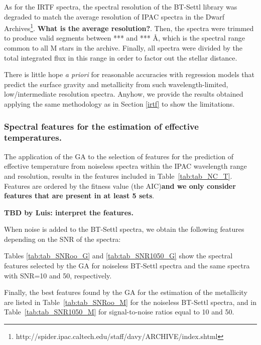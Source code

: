 
As for the IRTF spectra, the spectral resolution of the BT-Settl
library was degraded to match the average resolution of IPAC spectra
in the Dwarf
Archives\footnote{http://spider.ipac.caltech.edu/staff/davy/ARCHIVE/index.shtml}. {\bf
What is the average resolution?}. Then, the spectra were trimmed to
produce valid segments between *** and *** {\AA}, which is the
spectral range common to all M stars in the archive. Finally, all
spectra were divided by the total integrated flux in this range in
order to factor out the stellar distance.

There is little hope {\it a priori} for reasonable accuracies with
regression models that predict the surface gravity and metallicity
from such wavelength-limited, low/intermediate resolution
spectra. Anyhow, we provide the results obtained applying the same
methodology as in Section \ref{irtf} to show the limitations.

\subsubsection{Spectral features for the estimation of effective temperatures.}

The application of the GA to the selection of features for the
prediction of effective temperature from noiseless spectra within the
IPAC wavelength range and resolution, results in the features included
in Table~\ref{tab:tab_NC_T}. Features are ordered by the fitness value
(the AIC){\bf and we only consider features that are present in at least 5
sets}.

{\bf TBD by Luis: interpret the features.}

When noise is added to the BT-Settl spectra, we obtain the following
features depending on the SNR of the spectra:

Tables \ref{tab:tab_SNRoo_G} and \ref{tab:tab_SNR1050_G} show the
spectral features selected by the GA for noiseless BT-Settl spectra
and the same spectra with SNR=10 and 50, respectively.

Finally, the best features found by the GA for the estimation of the
metallicity are listed in Table~\ref{tab:tab_SNRoo_M} for the
noiseless BT-Settl spectra, and in Table~\ref{tab:tab_SNR1050_M} for
signal-to-noise ratios equal to 10 and 50.

